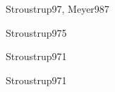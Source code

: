 \begin{syllabus}
\begin{unit}{\PLSIXDef}{Stroustrup97, Meyer98}{7}
   \begin{unitgoals}
      \item \PLSIXObjONE
      \item \PLSIXObjTWO
      \item \PLSIXObjTHREE
      \item \PLSIXObjFOUR
      \item \PLSIXObjFIVE
      \item \PLSIXObjSIX
      \item \PLSIXObjSEVEN
   \end{unitgoals}
\end{unit}

\begin{unit}{\SEONEDef}{Stroustrup97}{5}
   \begin{topics}
      \item \SEONETopicConceptos
      \item \SEONETopicDiseno
      \item \SEONETopicDisenopara
   \end{topics}
   \begin{unitgoals}
      \item \SEONEObjONE
      \item \SEONEObjFIVE
   \end{unitgoals}
\end{unit}

\begin{unit}{\SETWODef}{Stroustrup97}{1}
   \begin{topics}
   	\item \SETWOTopicProgramacion
	\item \SETWOTopicClass
	\item \SETWOTopicProgramacionpor
   \end{topics}
   \begin{unitgoals}
   	\item \SETWOObjONE
	\item \SETWOObjTWO
   \end{unitgoals}
\end{unit}

\begin{unit}{\SEFIVEDef}{Stroustrup97}{1}
   \begin{topics}
   	\item \SEFIVETopicRequerimientos
	\item \SEFIVETopicPrototipeo
	\item \SEFIVETopicConceptos
   \end{topics}
   \begin{unitgoals}
   	\item \SEFIVEObjTWO
	\item \SEFIVEObjTHREE
	\item \SEFIVEObjFIVE
   \end{unitgoals}
\end{unit}


\end{syllabus}
